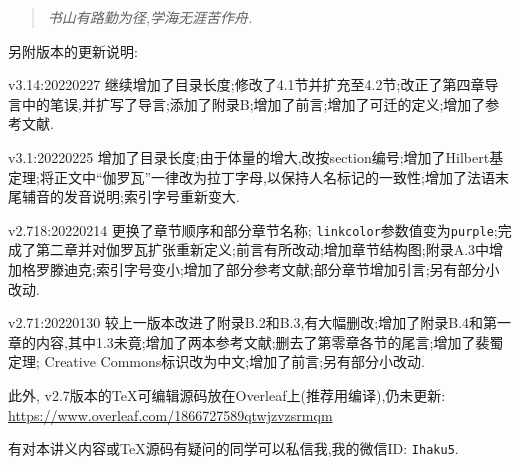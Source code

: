 \begin{quotation}
	\textit{书山有路勤为径,学海无涯苦作舟.}
\end{quotation}



\vspace*{\fill}

另附版本的更新说明:

v3.14:20220227 继续增加了目录长度;修改了4.1节并扩充至4.2节;改正了第四章导言中的笔误,并扩写了导言;添加了附录B;增加了前言;增加了可迁的定义;增加了参考文献.

v3.1:20220225 增加了目录长度;由于体量的增大,改按section编号;增加了Hilbert基定理;将正文中``伽罗瓦''一律改为拉丁字母,以保持人名标记的一致性;增加了法语末尾辅音的发音说明;索引字号重新变大.

v2.718:20220214 更换了章节顺序和部分章节名称; \texttt{linkcolor}参数值变为\texttt{purple};完成了第二章并对伽罗瓦扩张重新定义;前言有所改动;增加章节结构图;附录A.3中增加格罗滕迪克;索引字号变小;增加了部分参考文献;部分章节增加引言;另有部分小改动.

v2.71:20220130 较上一版本改进了附录B.2和B.3,有大幅删改;增加了附录B.4和第一章的内容,其中1.3未竟;增加了两本参考文献;删去了第零章各节的尾言;增加了裴蜀定理; Creative Commons标识改为中文;增加了前言;另有部分小改动.

此外, v2.7版本的\TeX 可编辑源码放在Overleaf上(推荐用\XeLaTeX 编译),仍未更新: \url{https://www.overleaf.com/1866727589qtwjzvzsrmqm}

有对本讲义内容或\TeX 源码有疑问的同学可以私信我,我的微信ID: \texttt{Ihaku5}.

\vspace*{\fill}